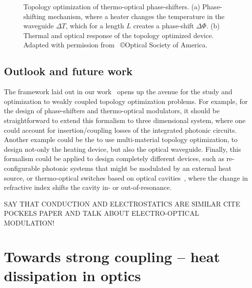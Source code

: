 \begin{figure}[tb]
    \centering
    \caption{Topology optimization of thermo-optical phase-shifters. (a) Phase-shifting mechanism, where a heater changes the temperature in the waveguide $\Delta T$, which for a length $L$ creates a phase-shift
    $\Delta \Phi$. (b) Thermal and optical response of the topology optimized device. Adapted with permission from~\cite{ownpub0} \copyright Optical Society of America.}
    \label{fig:thermo_res}
\end{figure}

\subsection*{Outlook and future work}

The framework laid out in our work~\cite{ownpub0} opens up the avenue for the study and optimization to weakly coupled topology optimization problems. For example, for the design of phase-shifters and thermo-optical modulators, it should be straightforward to extend this
formalism to three dimensional system, where one could account for insertion/coupling losses of the integrated photonic circuits. Another example could be the to use multi-material topology optimization, to design not-only the heating
device, but also the optical waveguide. Finally, this formalism could be applied to design completely different devices, such as re-configurable photonic systems that might be modulated by an external heat source, or thermo-optical
switches based on optical cavities~\cite{switch, switch_2}, where the change in refractive index shifts the cavity in- or out-of-resonance.

SAY THAT CONDUCTION AND ELECTROSTATICS ARE SIMILAR CITE POCKELS PAPER AND TALK ABOUT ELECTRO-OPTICAL MODULATION!

\section{Towards strong coupling -- heat dissipation in optics}

